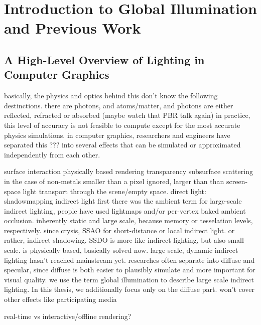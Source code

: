 
\chapter{Introduction to Global Illumination and Previous Work}


\section{A High-Level Overview of Lighting in Computer Graphics}
\begin{outline}

\1 basically, the physics and optics behind this don't know the following destinctions. there are photons, and atoms/matter, and photons are either reflected, refracted or absorbed (maybe watch that PBR talk again)
\1 in practice, this level of accuracy is not feasible to compute except for the most accurate physics simulations.
\1 in computer graphics, researchers and engineers have separated this ??? into several effects that can be simulated or approximated independently from each other.

\1 surface interaction
    \2 physically based rendering
    \2 transparency
    \2 subsurface scattering in the case of non-metals
        \3 smaller than a pixel ignored, larger than than screen-space
\1 light transport through the scene/empty space.
    \2 direct light: shadowmapping
    \2 indirect light
        \3 first there was the ambient term
        \3 for large-scale indirect lighting, people have used lightmaps and/or per-vertex baked ambient occlusion. inherently static and large scale, because memory or tesselation levels, respectively.
        \3 since crysis, SSAO for short-distance or local indirect light. or rather, indirect shadowing.
        \3 SSDO is more like indirect lighting, but also small-scale.
        \3 \citep{jimenez:2016:AO} is physically based, basically solved now.
        \3 large scale, dynamic indirect lighting hasn't reached mainstream yet.
        \3 researches often separate into diffuse and specular, since diffuse is both easier to plausibly simulate and more important for visual quality.
        \3 we use the term global illumination to describe large scale indirect lighting. In this thesis, we additionally focus only on the diffuse part.
    \2 won't cover other effects like participating media

\1 real-time vs interactive/offline rendering?
\end{outline}


